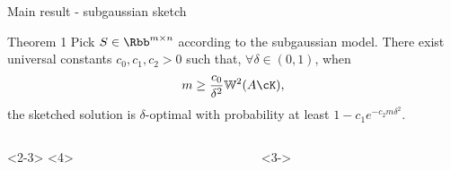 \documentclass[10pt]{beamer}
\begin{document}
\begin{frame}{Main result - subgaussian sketch}
    \begin{block}{Theorem 1}
        Pick $S \in \Rbb^{m \times n}$ according to the subgaussian model.
        There exist universal constants $c_0, c_1,
        c_2 > 0$ such that, $\forall \delta \in (0, 1)$, when
        \[
            m \geq \frac{c_0}{\delta^2} \mathbb{W}^2(A \cK), \]
        the sketched solution is $\delta$-optimal with probability at least
        \(
            1 - c_1 e^{-c_2 m \delta^2}.
        \)
    \end{block}
    \vspace{1em}
    \begin{columns}
        \begin{column}{0.49 \textwidth}
            \centering
            \only{
            \begin{tikzpicture}[scale=1.1]
                \duck[speech={\scriptsize So what?},
                      bubblecolour=white!35!cred!25,
                      squareglasses=blue!50!black]
            \end{tikzpicture}}<2-3>
            \only{
            \begin{tikzpicture}[scale=1.1]
                \duck[speech={\tiny $
                    \substack{\text{Sounds sketchy,}\\\text{but OK}}$},
                      bubblecolour=white!35!cred!25,
                      squareglasses=blue!50!black]
            \end{tikzpicture}}<4>
        \end{column}
        \begin{column}{0.49 \textwidth}
            <3->
        \end{column}
    \end{columns}
\end{frame}

%
\end{document}
